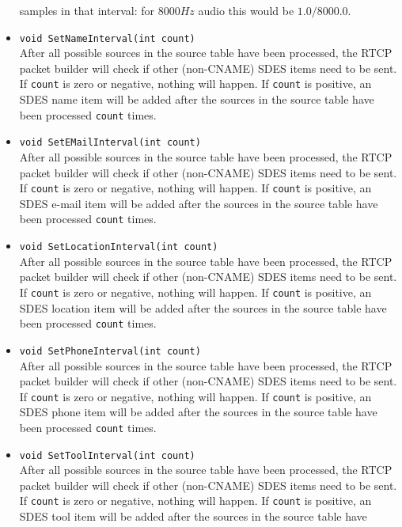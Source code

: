\documentclass[12pt,a4paper]{article}
\begin{document}
\begin{itemize}
						samples in that interval: for $8000 Hz$ audio this would
						be $1.0/8000.0$.
					\item {\tt void SetNameInterval(int count)}\\
						After all possible sources in the source table have been
						processed, the RTCP packet builder will check if other (non-CNAME) SDES 
						items need to be sent. If {\tt count} is zero or negative, nothing
						will happen. If {\tt count} is positive, an SDES name
						item will be added after the sources in the source table have
						been processed {\tt count} times.
					\item {\tt void SetEMailInterval(int count)}\\
						After all possible sources in the source table have been
						processed, the RTCP packet builder will check if other (non-CNAME) SDES 
						items need to be sent. If {\tt count} is zero or negative, nothing
						will happen. If {\tt count} is positive, an SDES e-mail
						item will be added after the sources in the source table have
						been processed {\tt count} times.
					\item {\tt void SetLocationInterval(int count)}\\
						After all possible sources in the source table have been
						processed, the RTCP packet builder will check if other (non-CNAME) SDES 
						items need to be sent. If {\tt count} is zero or negative, nothing
						will happen. If {\tt count} is positive, an SDES location
						item will be added after the sources in the source table have
						been processed {\tt count} times.
					\item {\tt void SetPhoneInterval(int count)}\\
						After all possible sources in the source table have been
						processed, the RTCP packet builder will check if other (non-CNAME) SDES 
						items need to be sent. If {\tt count} is zero or negative, nothing
						will happen. If {\tt count} is positive, an SDES phone
						item will be added after the sources in the source table have
						been processed {\tt count} times.
					\item {\tt void SetToolInterval(int count)}\\
						After all possible sources in the source table have been
						processed, the RTCP packet builder will check if other (non-CNAME) SDES 
						items need to be sent. If {\tt count} is zero or negative, nothing
						will happen. If {\tt count} is positive, an SDES tool
						item will be added after the sources in the source table have

\end{itemize}
\end{document}
